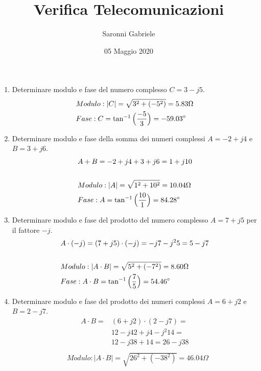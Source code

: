 \documentclass[fleqn]{exam}
\title{Verifica Telecomunicazioni}
\author{Saronni Gabriele}
\date{05 Maggio 2020}
\begin{document}
\begin{titlepage}
\maketitle
\end{titlepage}
\begin{enumerate}
    \item Determinare modulo e fase del numero complesso $C = 3 - j5$.
        \begin{align*}
            &Modulo: |C| = \sqrt{3^2 + (-5^2)}= 5.83\Omega \\
            &Fase: C = \tan^{-1}\Big(\frac{-5}{3}\Big)= -59.03\degree
        \end{align*}
    \item Determinare modulo e fase della somma dei numeri complessi $A = -2 + j4$ e $B = 3 + j6$. 
        \begin{align*}
            &A + B = -2 + j4 + 3 + j6 = 1 + j10 \\ \\
            &Modulo: |A| = \sqrt{1^2 + 10^2}= 10.04\Omega \\
            &Fase: A = \tan^{-1}\Big(\frac{10}{1}\Big)= 84.28\degree
        \end{align*}
    \item Determinare modulo e fase del prodotto del numero complesso $A = 7 + j5$ per il fattore $-j$. 
        \begin{align*}
            &A \cdot (-j) = (7 + j5) \cdot (-j) = -j7-j^2 5 = 5-j7 \\ \\
            &Modulo: |A\cdot B| = \sqrt{5^2 + (-7^2)}= 8.60\Omega \\
            &Fase: A\cdot B = \tan^{-1}\Big(\frac{7}{5}\Big)= 54.46\degree
        \end{align*}
    \item Determinare modulo e fase del prodotto dei numeri complessi $A = 6 + j2$ e $B = 2 - j7$. 
        \begin{align*}
            A\cdot B = &(6 + j2)\cdot (2 - j7) = \\
            &12-j42+j4-j^2 14 = \\
            &12-j38+14= 26-j38 \\
        \end{align*}
        \begin{align*}
            &Modulo: |A\cdot B| = \sqrt{26^2 + (-38^2)}= 46.04\Omega \\

\end{align*}
\end{enumerate}
\end{document}
